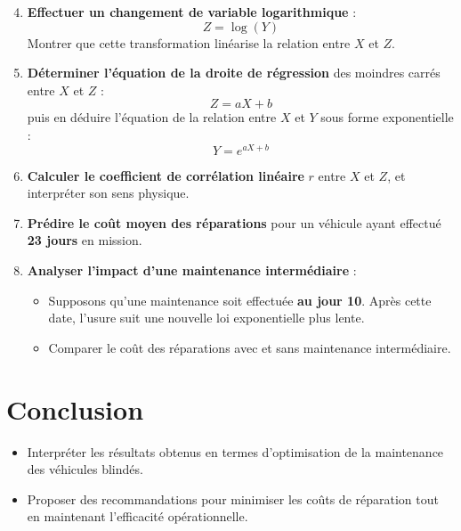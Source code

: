 \documentclass[a4paper,12pt]{article}
\begin{document}
\begin{enumerate}
    \setcounter{enumi}{3}
    \item \textbf{Effectuer un changement de variable logarithmique} :
    \[
    Z = \log(Y)
    \]
    Montrer que cette transformation linéarise la relation entre \( X \) et \( Z \).
    
    \item \textbf{Déterminer l’équation de la droite de régression} des moindres carrés entre \( X \) et \( Z \) :
    \[
    Z = aX + b
    \]
    puis en déduire l’équation de la relation entre \( X \) et \( Y \) sous forme exponentielle :
    \[
    Y = e^{aX + b}
    \]

    \item \textbf{Calculer le coefficient de corrélation linéaire} \( r \) entre \( X \) et \( Z \), et interpréter son sens physique.
    
    \item \textbf{Prédire le coût moyen des réparations} pour un véhicule ayant effectué \textbf{23 jours} en mission.

    \item \textbf{Analyser l’impact d’une maintenance intermédiaire} :
    \begin{itemize}
        \item Supposons qu’une maintenance soit effectuée \textbf{au jour 10}. Après cette date, l’usure suit une nouvelle loi exponentielle plus lente.
        \item Comparer le coût des réparations avec et sans maintenance intermédiaire.
    \end{itemize}
\end{enumerate}

\section{Conclusion}

\begin{itemize}
    \item Interpréter les résultats obtenus en termes d’optimisation de la maintenance des véhicules blindés.
    \item Proposer des recommandations pour minimiser les coûts de réparation tout en maintenant l’efficacité opérationnelle.
\end{itemize}
\end{document}
